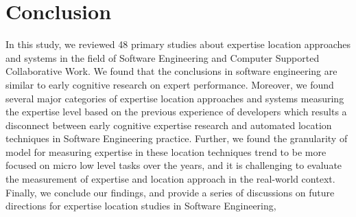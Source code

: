 \chapter{Conclusion}

In this study, we reviewed 48 primary studies about expertise location approaches and systems in the field of Software Engineering and Computer Supported Collaborative Work. We found that the conclusions in software engineering are similar to early cognitive research on expert performance. Moreover, we found several major categories of expertise location approaches and systems measuring the expertise level based on the previous experience of developers which results a disconnect between early cognitive expertise research and automated location techniques in Software Engineering practice. Further, we found the granularity of model for measuring expertise in these location techniques trend to be more focused on micro low level tasks over the years, and it is challenging to evaluate the measurement of expertise and location approach in the real-world context. Finally, we conclude our findings, and provide a series of discussions on future directions for expertise location studies in Software Engineering,